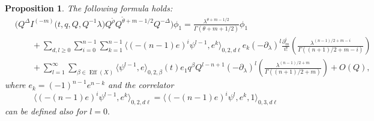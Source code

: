 \documentclass[pdftex]{sigma}
\numberwithin{equation}{section}
\newtheorem{Proposition}[Theorem]{Proposition}
\begin{document}
\begin{Proposition}\label{prop:Q-exp_phi1}
The following formula holds:
\begin{align}
&
\big(
Q^\Delta
I^{(-m)}\big(t,q,Q, Q^{-1}\lambda\big)
Q^{\widetilde{\rho}} Q^{\widetilde{\theta}+m-1/2}
Q^{-\Delta} \big) \phi_1 =
\frac{
\lambda^{\theta+m-1/2}
}{
\Gamma(\theta+m+1/2)} \phi_1\nonumber\\ &\qquad+
\sum_{d,l\geq 0}
\sum_{i=0}^{n-1}
\sum_{k=1}^{n-1}
\big\langle (-(n-1)e)^i \psi^{l-1}, e^k\big\rangle_{0,2,d\ell} e_k (-\partial_\lambda)^l
\frac{\partial_m^i}{i!} \left(
\frac{\lambda^{(n-1)/2+m-i}}{
\Gamma((n+1)/2+m-i) }\right)\!\! \label{Q:exp_phi1_l2}\\
&\qquad+
\sum_{l=1}^\infty
\sum_{\beta\in \operatorname{Eff}(X)}
\big\langle \psi^{l-1},e\big\rangle_{0,2,\beta}(t) e_1
q^\beta Q^{l-n+1}
(-\partial_\lambda)^l \left(
\frac{\lambda^{(n-1)/2+m}}{
\Gamma((n+1)/2+m) }\right)
+ O(Q),\label{Q:exp_phi1_l3}
\end{align}
where $e_k=(-1)^{n-1} e^{n-k}$ and the correlator
\[
\big\langle (-(n-1)e)^i \psi^{l-1}, e^k\big\rangle_{0,2,d\ell}=
\big\langle (-(n-1)e)^i \psi^{l}, e^k,1\big\rangle_{0,3,d\ell}
\]
can be defined also for $l=0.$
\end{Proposition}
\end{document}
